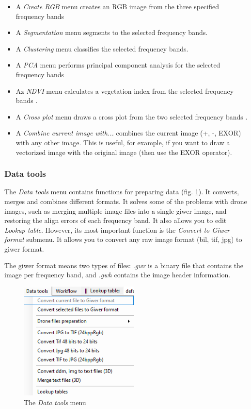 \documentclass[a4paper,12pt]{article}
\begin{document}
\begin{itemize}	
	\item A \textit{Create RGB} menu creates an RGB image from the three specified frequency bands 
	
	\item A \textit{Segmentation} menu segments to the selected frequency bands.
	
	\item A \textit{Clustering} menu classifies the selected frequency bands.
	
	\item A \textit{PCA} menu performs principal component analysis for the selected frequency bands 
	
	\item Az \textit{NDVI} menu calculates a vegetation index from the selected frequency bands .
	
	\item A \textit{Cross plot} menu draws a cross plot from the two selected frequency bands .
	
	\item A \textit{Combine current image with...} combines the current image (+, -, EXOR) with any other image. This is useful, for example, if you want to draw a vectorized image with the original image (then use the EXOR operator). 	
\end{itemize}

\subsubsection{Data tools}

The \textit {Data tools} menu contains functions for preparing data (fig. \ref {fig:datatools_menu}). It converts, merges and combines different formats. It solves some of the problems with drone images, such as merging multiple image files into a single giwer image, and restoring the align errors of each frequency band. It also allows you to edit \textit {Lookup table}. However, its most important function is the \textit {Convert to Giwer format} submenu. It allows you to convert any raw image format (bil, tif, jpg) to giwer format.

The giwer format means two types of files: \textit {.gwr} is a binary file that contains the image per frequency band, and \textit {.gwh} contains the image header information. 

\begin{figure}
	\centering
	\includegraphics[width=6cm]{datatools_menu.png}
	\caption{The \textit{Data tools} menu}
	\label{fig:datatools_menu}
\end{figure}
\end{document}
